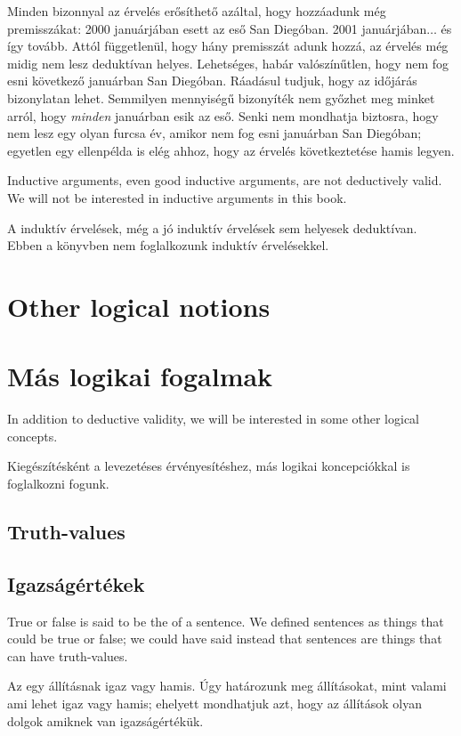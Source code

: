 Minden bizonnyal az érvelés erősíthető azáltal, hogy hozzáadunk még premisszákat: 2000 januárjában esett az eső San Diegóban. 2001 januárjában$\ldots$ és így tovább. Attól függetlenül, hogy hány premisszát adunk hozzá, az érvelés még midig nem lesz deduktívan helyes. Lehetséges, habár valószínűtlen, hogy nem fog esni következő januárban San Diegóban. Ráadásul tudjuk, hogy az időjárás bizonylatan lehet. Semmilyen mennyiségű bizonyíték nem győzhet meg minket arról, hogy \emph{minden} januárban esik az eső. Senki nem mondhatja biztosra, hogy nem lesz egy olyan furcsa év, amikor nem fog esni januárban San Diegóban; egyetlen egy ellenpélda is elég ahhoz, hogy az érvelés következtetése hamis legyen.

Inductive arguments, even good inductive arguments, are not deductively valid. We will not be interested in inductive arguments in this book.

A induktív érvelések, még a jó induktív érvelések sem helyesek deduktívan. Ebben a könyvben nem foglalkozunk induktív érvelésekkel.


\section*{Other logical notions}
\section{Más logikai fogalmak}

In addition to deductive validity, we will be interested in some other logical concepts.

Kiegészítésként a levezetéses érvényesítéshez, más logikai koncepciókkal is foglalkozni fogunk.

\subsection*{Truth-values}
\subsection{Igazságértékek}
True or false is said to be the  of a sentence. We defined sentences as things that could be true or false; we could have said instead that sentences are things that can have truth-values.

Az  egy állításnak igaz vagy hamis. Úgy határozunk meg állításokat, mint valami ami lehet igaz vagy hamis; ehelyett mondhatjuk azt, hogy az állítások olyan dolgok amiknek van igazságértékük.

